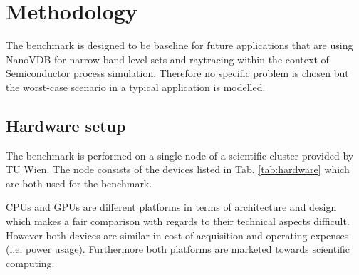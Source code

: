 \setcounter{section}{1}
\section{Methodology}






The benchmark is designed to be baseline for future applications that are using NanoVDB for narrow-band level-sets and raytracing within the context of Semiconductor process simulation.
Therefore no specific problem is chosen but the worst-case scenario in a typical application is modelled. 


\subsection{Hardware setup}
The benchmark is performed on a single node of a scientific cluster provided by TU Wien. 
The node consists of the devices listed in Tab. \ref{tab:hardware} which are both used for the benchmark.

CPUs and GPUs are different platforms in terms of architecture and design which makes a fair comparison with regards to their technical aspects difficult.
However both devices are similar in cost of acquisition and operating expenses (i.e. power usage). 
Furthermore both platforms are marketed towards scientific computing.


